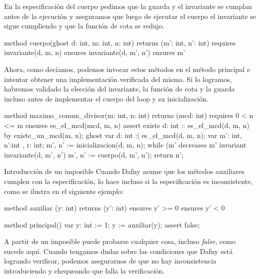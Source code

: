 \documentclass[12pt, a4paper, openany, fleqn]{book}
\begin{document}
    En la especificación del cuerpo pedimos que la guarda y el invariante se cumplan antes de la ejecución y aseguramos que luego de ejecutar el cuerpo el invariante se sigue cumpliendo y que la función de cota se redujo.


    \begin{greenbox}
    \begin{dafny}[gobble=8]
        method cuerpo(ghost d: int, m: int, n: int)
            returns (m': int, n': int)
            requires invariante(d, m, n)
            ensures invariante(d, m', n')
            ensures m' %
    \end{dafny}
    \end{greenbox}

    Ahora, como decíamos, podemos invocar estos métodos en el método principal e intentar obtener una implementación verificada del mismo. Si lo logramos, habremos validado la elección del invariante, la función de cota y la guarda incluso antes de implementar el cuerpo del loop y su inicialización.


    \begin{greenbox}
    \begin{dafny}[gobble=8]
        method maximo_comun_divisor(m: int, n: int) returns (mcd: int)
            requires 0 < n <= m
            ensures es_el_mcd(mcd, m, n)
        {
            assert exists d: int :: es_el_mcd(d, m, n) by {
                existe_un_mcd(m, n);
            }
            ghost var d: int :| es_el_mcd(d, m, n);
            var m': int, n':int , r: int;
            m', n' := inicializacion(d, m, n);
            while (m' %
                decreases m' %
                invariant invariante(d, m', n')
            {
                m', n' := cuerpo(d, m', n');
            }
            return n';
        }
    \end{dafny}
    \end{greenbox}


    \begin{warningbox}{Introducción de un imposible}
    Cuando Dafny asume que los métodos auxiliares cumplen con la especificación, lo hace incluso si la especificación es inconsistente, como se ilustra en el siguiente ejemplo:

    \begin{greenbox}
    \begin{dafny}[gobble=8]
        method auxiliar (y: int) returns (y': int)
            ensures y' >= 0
            ensures y' < 0

        method principal() {
            var y: int := 1;
            y := auxiliar(y);
            assert false;
        }
    \end{dafny}
    \end{greenbox}

    A partir de un imposible puede probarse cualquier cosa, incluso \textit{false}, como sucede aquí. Cuando tengamos dudas sobre las condiciones que Dafny está logrando verificar, podemos asegurarnos de que no hay inconsistencia introduciendo  y chequeando que falla la verificación.
\end{warningbox}
\end{document}
